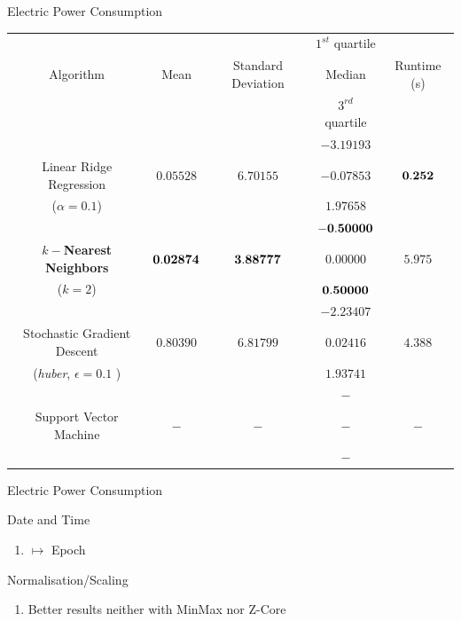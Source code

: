 \begin{frame}{Electric Power Consumption}
\begin{tcolorbox}[colback=blue!5,colframe=gray!40!black,title=Final
Comparison]


\begin{table}
\centering
\resizebox{\columnwidth}{!}
	{
		\begin{tabular}{|c|c|c|c|c|}
					\hline  &&& $1^{st}$ quartile
					&\\{Algorithm}&Mean&Standard Deviation&Median& Runtime (s)\\&&& $3^{rd}$
					quartile &\\
					\hline &&&$-3.19193$&\\
					{Linear Ridge
		Regression}& $0.05528$ & $6.70155$  & $-0.07853$ & $\bf {0.252}$\\
					 ($\alpha = 0.1$)&&&$1.97658$& \\
					\hline &&&$\bf {-0.50000}$&\\
					\bf {{$k-$Nearest Neighbors}}& $\bf {0.02874}$ & $\bf {3.88777}$  &
					$0.00000$ & $5.975$\\
					 ($k = 2$)&&&$\bf {0.50000}$& \\
					\hline &&&$-2.23407$&\\
					{Stochastic Gradient Descent }& $0.80390$ & $6.81799$  & $0.02416$ &
					$4.388$\\
					({\it huber}, $\epsilon = 0.1$ )&&&$1.93741$& \\
					\hline &&&$-$&\\
					{Support Vector Machine }& $-$ & $-$  & $-$ &
					$-$\\
					&&& $-$ & \\
					\hline

		\end{tabular}
	}



\end{table}



\end{tcolorbox}
\end{frame}

\begin{frame}{Electric Power Consumption}


\begin{tcolorbox}[colback=red!5,colframe=red!40!black,title=Preprocessing's
impact]

\bi
\mi Date and Time 
\begin{enumerate}
    \item $\mapsto$ Epoch
  \end{enumerate}
  
  \mi Normalisation/Scaling 
\begin{enumerate}
    \item Better results neither with MinMax nor Z-Core
  \end{enumerate}
  
\ei


\end{tcolorbox}

\end{frame}